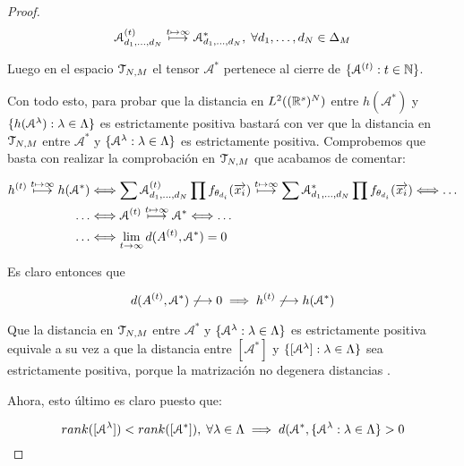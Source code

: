 \begin{proof}
    \begin{equation}
        \mathcal{A}^{(t)}_{d_1, \ldots, d_N} \stackrel{t \mapsto \infty}{\longmapsto} \mathcal{A}^*_{d_1, \ldots, d_N},
        \; \forall d_1, \ldots, d_N \in \Delta_{M}
    \end{equation}

    Luego en el espacio $\mathcal{T}_{N, M}$ el tensor $\mathcal{A}^*$ pertenece al cierre de $\{ \mathcal{A}^{(t)}: t \in \mathbb{N} \}$.

    Con todo esto, para probar que la distancia en $L^2((\mathbb{R}^s)^N)$ entre $h(\mathcal{A}^*)$ y $\{ h(\mathcal{A}^\lambda): \lambda \in \Lambda \}$ es estrictamente positiva bastará con ver que la distancia en $\mathcal{T}_{N, M}$ entre $\mathcal{A}^*$ y $\{ \mathcal{A}^\lambda: \lambda \in \Lambda \}$ es estrictamente positiva. Comprobemos que basta con realizar la comprobación en $\mathcal{T}_{N, M}$ que acabamos de comentar:

    \begin{equation}
    \begin{split}
        h^{(t)} \stackrel{t \mapsto \infty}{\longmapsto} h(\mathcal{A}^*) &\Longleftrightarrow \sum \mathcal{A}^{(t)}_{d_1, \ldots, d_N} \prod f_{\theta_{d_i}}(\overrightarrow{x_i}) \stackrel{t \mapsto \infty}{\longmapsto} \sum \mathcal{A}^*_{d_1, \ldots, d_N} \prod f_{\theta_{d_i}}(\overrightarrow{x_i}) \Longleftrightarrow \ldots \\
        \ldots &\Longleftrightarrow \mathcal{A}^{(t)} \stackrel{t \mapsto \infty}{\longmapsto} \mathcal{A}^* \Longleftrightarrow \ldots \\
        \ldots &\Longleftrightarrow \lim_{t \to \infty} d(A^{(t)}, \mathcal{A}^*) = 0
    \end{split}
    \end{equation}

    Es claro entonces que

    \begin{equation}
        d(A^{(t)}, \mathcal{A}^*) \not\longrightarrow 0 \implies h^{(t)} \not\longrightarrow h(\mathcal{A}^*)
    \end{equation}

    Que la distancia en $\mathcal{T}_{N, M}$ entre $\mathcal{A}^*$ y $\{ \mathcal{A}^\lambda: \lambda \in \Lambda \}$ es estrictamente positiva equivale a su vez a que la distancia entre $[\mathcal{A}^*]$ y $\{ [\mathcal{A}^\lambda]: \lambda \in \Lambda \}$ sea estrictamente positiva, porque la matrización no degenera distancias \footnotemark.


    Ahora, esto último es claro puesto que:

    \begin{equation}
        rank([\mathcal{A}^\lambda]) < rank([\mathcal{A}^*]), \; \forall \lambda \in \Lambda \implies d(\mathcal{A}^*, \{ \mathcal{A}^\lambda: \lambda \in \Lambda \} > 0
    \end{equation}
\end{proof}

